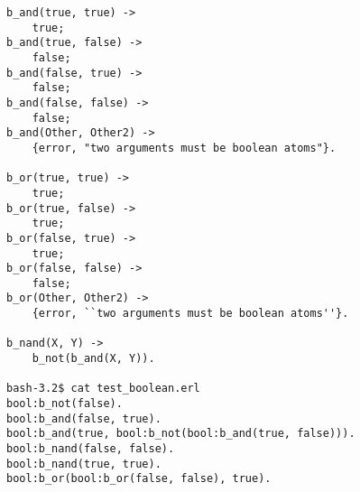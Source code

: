 \begin{questions}
\begin{solution}
{\begin{verbatim}
b_and(true, true) ->                                                              
    true;                                                                         
b_and(true, false) ->                                                             
    false;                                                                        
b_and(false, true) ->                                                             
    false;                                                                        
b_and(false, false) ->                                                            
    false;                                                                        
b_and(Other, Other2) ->                                                           
    {error, "two arguments must be boolean atoms"}. 
                                                                                      
b_or(true, true) ->                                                               
    true;                                                                         
b_or(true, false) ->                                                              
    true;                                                                         
b_or(false, true) ->                                                              
    true;                                                                         
b_or(false, false) ->                                                             
    false;                                                                        
b_or(Other, Other2) ->                                                            
    {error, ``two arguments must be boolean atoms''}.                               
                                                                                  
b_nand(X, Y) ->                                                                   
    b_not(b_and(X, Y)).                                                           
                                                                                  
bash-3.2$ cat test_boolean.erl                                                    
bool:b_not(false).                                                                
bool:b_and(false, true).                                                          
bool:b_and(true, bool:b_not(bool:b_and(true, false))).                            
bool:b_nand(false, false).                                                        
bool:b_nand(true, true).                                                          
bool:b_or(bool:b_or(false, false), true).                                         
                                                                                  

\end{verbatim}}
\end{solution}
\end{questions}

